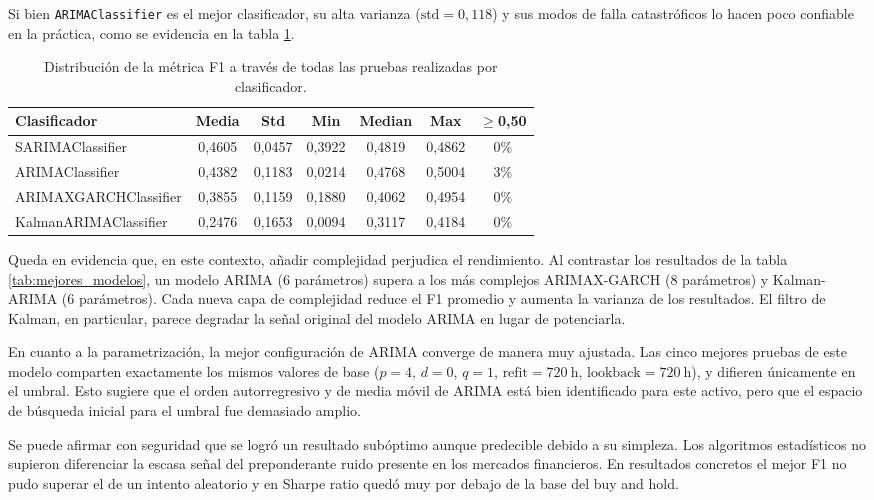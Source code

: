 Si bien \texttt{ARIMAClassifier} es el mejor clasificador, su alta varianza ($\text{std} = 0,118$) y sus modos de falla catastróficos lo hacen poco confiable en la práctica, como se evidencia en la tabla \ref{tab:distribucion_f1}.
\begin{table}[H]
  \centering
  \caption[Distribución de F1]{Distribución de la métrica F1 a través de todas las pruebas realizadas por clasificador.}
  \small
  \begin{adjustbox}{max width=\textwidth}
  \begin{tabular}{l c c c c c c}
    \toprule
    \textbf{Clasificador} & \textbf{Media} & \textbf{Std} & \textbf{Min} & \textbf{Median} & \textbf{Max} & \textbf{$\ge$0,50} \\
    \midrule
    SARIMAClassifier       & 0,4605 & 0,0457 & 0,3922 & 0,4819 & 0,4862 & 0\% \\
    ARIMAClassifier        & 0,4382 & 0,1183 & 0,0214 & 0,4768 & 0,5004 & 3\% \\
    ARIMAXGARCHClassifier  & 0,3855 & 0,1159 & 0,1880 & 0,4062 & 0,4954 & 0\% \\
    KalmanARIMAClassifier  & 0,2476 & 0,1653 & 0,0094 & 0,3117 & 0,4184 & 0\% \\
    \bottomrule
  \end{tabular}
  \end{adjustbox}
  \label{tab:distribucion_f1}
\end{table}

Queda en evidencia que, en este contexto, añadir complejidad perjudica el rendimiento. Al contrastar los resultados de la tabla \ref{tab:mejores_modelos}, un modelo ARIMA (6 parámetros) supera a los más complejos ARIMAX-GARCH (8 parámetros) y Kalman-ARIMA (6 parámetros). Cada nueva capa de complejidad reduce el F1 promedio y aumenta la varianza de los resultados. El filtro de Kalman, en particular, parece degradar la señal original del modelo ARIMA en lugar de potenciarla.


En cuanto a la parametrización, la mejor configuración de ARIMA converge de manera muy ajustada. Las cinco mejores pruebas de este modelo comparten exactamente los mismos valores de base ($p=4$, $d=0$, $q=1$, $\text{refit}=720\ \text{h}$, $\text{lookback}=720\ \text{h}$), y difieren únicamente en el umbral. Esto sugiere que el orden autorregresivo y de media móvil de ARIMA está bien identificado para este activo, pero que el espacio de búsqueda inicial para el umbral fue demasiado amplio.

Se puede afirmar con seguridad que se logró un resultado subóptimo aunque predecible debido a su simpleza. Los algoritmos estadísticos no supieron diferenciar la escasa señal del preponderante ruido presente en los mercados financieros. En resultados concretos el mejor F1 no pudo superar el de un intento aleatorio y en Sharpe ratio quedó muy por debajo de la base del buy and hold.

